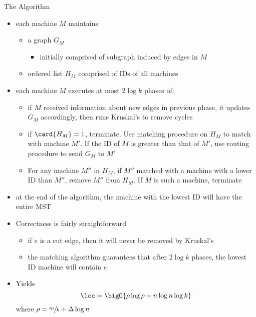 \begin{frame}{The Algorithm}
    \begin{itemize}
        \item each machine $M$ maintains
              \begin{itemize}
                  \item a graph $G_M$
                        \begin{itemize}
                            \item initially comprised of subgraph induced by edges in $M$
                        \end{itemize}
                  \item ordered list $H_M$ comprised of IDs of all machines
              \end{itemize}
        \item each machine $M$ executes at most $2\log{k}$ phases of:
              \begin{itemize}
                  \item if $M$ received information about new edges in previous phase,
                        it updates $G_M$ accordingly, then runs Kruskal's to remove cycles
                  \item if $\card{H_M} = 1$, terminate. Use matching procedure on $H_M$ to
                        match with machine $M'$. If the ID of $M$ is greater than that of $M'$,
                        use routing procedure to send $G_M$ to $M'$
                  \item For any machine $M''$ in $H_M$, if $M''$ matched with a machine with
                        a lower ID than $M''$, remove $M''$ from $H_M$. If $M$ is such a machine,
                        terminate
              \end{itemize}
        \item at the end of the algorithm, the machine with the lowest ID will have
              the entire MST
    \end{itemize}
\end{frame}

\begin{frame}
    \begin{itemize}
        \item Correctness is fairly straightforward
        \begin{itemize}
            \item if $e$ is a cut edge, then it will never be removed by Kruskal's
            \item the matching algorithm guarantees that after $2\log{k}$ phases, the lowest
            ID machine will contain $e$
        \end{itemize}
        \item Yields
        \[\lcc = \bigO{\rho\log{\rho} + n\log{n}\log{k}}\]
        where $\rho = \sfrac{m}{k} + \Delta\log{n}$
    \end{itemize}
\end{frame}
